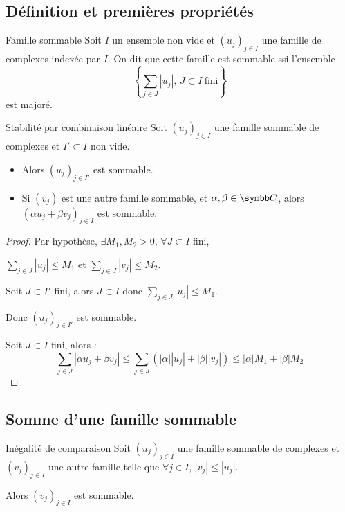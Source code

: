 \subsection{Définition et premières propriétés}

\begin{definition}{Famille sommable}{}
    Soit $I$ un ensemble non vide et $(u_j)_{j \in I}$ une famille de complexes indexée par $I$. 
    On dit que cette famille est sommable ssi l'ensemble 
    \[\left\{\sum_{j \in J} |u_j|, \, J \subset I~\text{fini} \right\}\]
    est majoré. 
\end{definition}

\begin{proposition}{Stabilité par combinaison linéaire}{}
    Soit $(u_j)_{j \in I}$ une famille sommable de complexes et $I' \subset I$ non vide.
    \begin{itemize}
        \item Alors $(u_j)_{j \in I'}$ est sommable. 
        \item Si $(v_j)$ est une autre famille sommable, et $\alpha, \beta \in \C$, alors 
        $(\alpha u_j + \beta v_j)_{j \in I}$ est sommable.
    \end{itemize}
\end{proposition}


\begin{proof}
    Par hypothèse, $\exists M_1, M_2 > 0, \, \forall J \subset I$ fini, 

    $\displaystyle \sum_{j \in J} |u_j| \leqslant M_1$ et $\displaystyle \sum_{j \in J} |v_j| \leqslant M_2$.

    Soit $J \subset I'$ fini, alors $J \subset I$ donc $\sum_{j \in J } |u_j| \leqslant M_1$.

    Donc $(u_j)_{j \in I'}$ est sommable.

    Soit $J \subset I$ fini, alors :
    \[\sum_{j \in J} |\alpha u_j + \beta v_j | \leqslant \sum_{j \in J} (|\alpha| |u_j| + |\beta| |v_j|) \leqslant |\alpha| M_1 + |\beta| M_2\]
\end{proof}

\subsection{Somme d'une famille sommable}

\begin{proposition}{Inégalité de comparaison}{}
    Soit $(u_j)_{j \in I}$ une famille sommable de complexes et $(v_j)_{j \in I}$
    une autre famille telle que $\forall j \in I, \, |v_j| \leqslant |u_j|$.

    Alors $(v_j)_{j \in I}$ est sommable.
\end{proposition}

